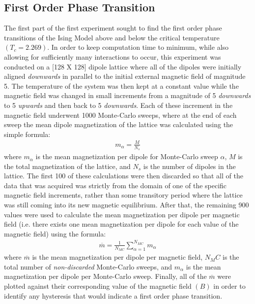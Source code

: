 \documentclass[twocolumn]{article}
\begin{document}
\subsection{First Order Phase Transition}
\hspace{\parindent}The first part of the first experiment sought to find the first order phase transitions of the Ising Model above and below the critical temperature $\left(T_c=2.269\right)$. In order to keep computation time to minimum, while also allowing for sufficiently many interactions to occur, this experiment was conducted on a [128 X 128] dipole lattice where all of the dipoles were initially aligned \textit{downwards} in parallel to the initial external magnetic field of magnitude 5. The temperature of the system was then kept at a constant value while the magnetic field was changed in small increments from a magnitude of 5 \textit{downwards} to 5 \textit{upwards} and then back to 5 \textit{downwards}. Each of these increment in the magnetic field underwent 1000 Monte-Carlo sweeps, where at the end of each sweep the mean dipole magnetization of the lattice was calculated using the simple formula:
\begin{align}
m_\alpha=\frac{M}{N_s}
\end{align}
where $m_\alpha$ is the mean magnetization per dipole for Monte-Carlo sweep $\alpha$, $M$ is the total magnetization of the lattice, and $N_s$ is the number of dipoles in the lattice.
The first 100 of these calculations were then discarded so that all of the data that was acquired was strictly from the domain of one of the specific magnetic field increments, rather than some transitory period where the lattice was still coming into its new magnetic equilibrium. After that, the remaining 900 values were used to calculate the mean magnetization per dipole per magnetic field (i.e. there exists one mean magnetization per dipole for each value of the magnetic field) using the formula:
\begin{align}
\overline{m}=\frac{1}{N_{MC}}\sum_{\alpha=1}^{N_{MC}}m_{\alpha}
\end{align}
where $\overline{m}$ is the mean magnetization per dipole per magnetic field, $N_MC$ is the total number of \textit{non-discarded} Monte-Carlo sweeps, and $m_\alpha$ is the mean magnetization per dipole per Monte-Carlo sweep. Finally, all of the $\overline{m}$ were plotted against their corresponding value of the magnetic field $\left(B\right)$ in order to identify any hysteresis that would indicate a first order phase transition.
\end{document}
